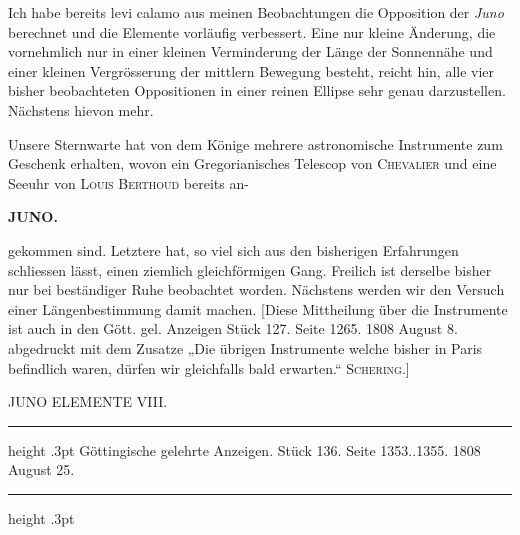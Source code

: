 \par{}

\par\indent Ich habe bereits levi calamo aus meinen Beobachtungen die Opposition der \emph{Juno} berechnet und
die Elemente vorläufig verbessert. Eine nur kleine Änderung, die vornehmlich nur in einer kleinen
Verminderung der Länge der Sonnennähe und einer kleinen Vergrösserung der mittlern Bewegung besteht, reicht hin, alle vier bisher beobachteten Oppositionen in einer reinen Ellipse sehr genau darzustellen. Nächstens hievon mehr.

\par\indent Unsere Sternwarte hat von dem Könige mehrere astronomische Instrumente zum Geschenk erhalten, wovon ein Gregorianisches Telescop von \textsc{Chevalier} und eine Seeuhr von \textsc{Louis Berthoud} bereits an-\par
{}
\clearpage
\thispagestyle{empty}
\noindent{}%
%
\parbox[t]{\dimexpr\linewidth-24mm\relax}{\centering\footnotesize\bfseries JUNO.\par}%
\makebox[12mm][r]{}\par\nobreak\medskip
\noindent gekommen sind. Letztere hat, so viel sich aus den bisherigen Erfahrungen schliessen lässt, einen ziemlich gleichförmigen Gang. Freilich ist derselbe bisher nur bei beständiger Ruhe beobachtet worden.
Nächstens werden wir den Versuch einer Längenbestimmung damit machen. [Diese Mittheilung über
die Instrumente ist auch in den Gött. gel. Anzeigen Stück 127. Seite 1265. 1808 August 8. abgedruckt
mit dem Zusatze „Die übrigen Instrumente welche bisher in Paris befindlich waren, dürfen wir gleichfalls bald erwarten.“ \textsc{Schering}.]

\par\bigskip
{}
\begin{center}\large JUNO ELEMENTE VIII.\end{center}
\begin{center}\parbox{.90\linewidth}{\centering\footnotesize\frenchspacing
\hrule height .3pt\relax\vspace{2.5pt}
Göttingische gelehrte Anzeigen. Stück 136. Seite 1353..1355. 1808 August 25.\par
\vspace{2.5pt}\hrule height .3pt\relax
}\end{center}


